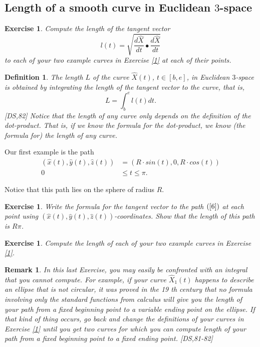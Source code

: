 \documentclass{article}%
\newtheorem{definition}[theorem]{Definition}
\newtheorem{exercise}[theorem]{Exercise}
\newtheorem{remark}[theorem]{Remark}
\begin{document}
\subsection{Length of a smooth curve in Euclidean $3$-space}

\begin{exercise}
Compute the length of the tangent vector
\[
l(t)=\sqrt{\frac{d\hat{X}}{dt}\bullet\frac{d\hat{X}}{dt}}%
\]
to each of your two example curves in Exercise \ref{1} at each of their points.
\end{exercise}

\begin{definition}
The length $L$ of the curve $\hat{X}\left(  t\right)  $, $t\in\left[
b,e\right]  $, in Euclidean $3$-space is obtained by integrating the length of
the tangent vector to the curve, that is,%
\[
L=%
{\displaystyle\int\nolimits_{b}^{e}}
l\left(  t\right)  dt.
\]
[DS,82] Notice that the length of any curve only depends on the definition of
the dot-product. That is, if we know the formula for the dot-product, we know
(the formula for) the length of any curve.
\end{definition}

Our first example is the path%
\begin{align}
\left(  \hat{x}\left(  t\right)  ,\hat{y}\left(  t\right)  ,\hat{z}\left(
t\right)  \right)   &  =\left(  R\cdot sin\left(  t\right)  ,0,R\cdot
cos\left(  t\right)  \right) \label{6}\\
0\,  &  \leq t\leq\pi.\nonumber
\end{align}


Notice that this path lies on the sphere of radius $R$.

\begin{exercise}
Write the formula for the tangent vector to the path $\left(  \ref{6}\right)
$ at each point using $\left(  \hat{x}\left(  t\right)  ,\hat{y}\left(
t\right)  ,\hat{z}\left(  t\right)  \right)  $-coordinates. Show that the
length of this path is $R\pi$.
\end{exercise}

\begin{exercise}
Compute the length of each of your two example curves in Exercise \ref{1}.
\end{exercise}

\begin{remark}
In this last Exercise, you may easily be confronted with an integral that you
cannot compute. For example, if your curve $\hat{X}_{1}\left(  t\right)  $
happens to describe an ellipse that is not circular, it was proved in the 19
th century that no formula involving only the standard functions from calculus
will give you the length of your path from a fixed beginning point to a
variable ending point on the ellipse. If that kind of thing occurs, go back
and change the definitions of your curves in Exercise \ref{1} until you get
two curves for which you can compute length of your path from a fixed
beginning point to a fixed ending point. [DS,81-82]
\end{remark}
\end{document}
